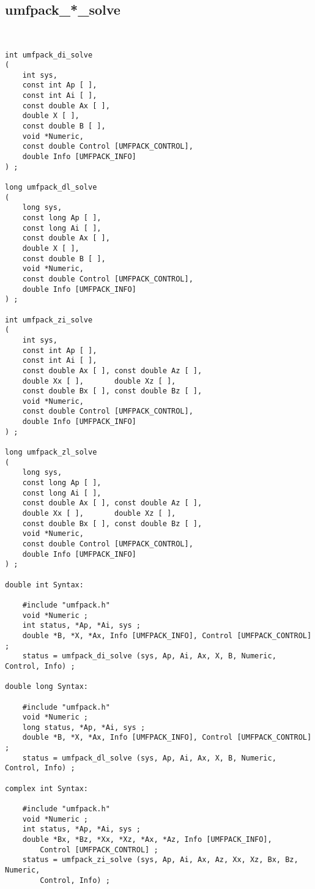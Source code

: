 \newpage
\subsection{umfpack\_*\_solve}

{\footnotesize
\begin{verbatim}


int umfpack_di_solve
(
    int sys,
    const int Ap [ ],
    const int Ai [ ],
    const double Ax [ ],
    double X [ ],
    const double B [ ],
    void *Numeric,
    const double Control [UMFPACK_CONTROL],
    double Info [UMFPACK_INFO]
) ;

long umfpack_dl_solve
(
    long sys,
    const long Ap [ ],
    const long Ai [ ],
    const double Ax [ ],
    double X [ ],
    const double B [ ],
    void *Numeric,
    const double Control [UMFPACK_CONTROL],
    double Info [UMFPACK_INFO]
) ;

int umfpack_zi_solve
(
    int sys,
    const int Ap [ ],
    const int Ai [ ],
    const double Ax [ ], const double Az [ ],
    double Xx [ ],       double Xz [ ],
    const double Bx [ ], const double Bz [ ],
    void *Numeric,
    const double Control [UMFPACK_CONTROL],
    double Info [UMFPACK_INFO]
) ;

long umfpack_zl_solve
(
    long sys,
    const long Ap [ ],
    const long Ai [ ],
    const double Ax [ ], const double Az [ ],
    double Xx [ ],       double Xz [ ],
    const double Bx [ ], const double Bz [ ],
    void *Numeric,
    const double Control [UMFPACK_CONTROL],
    double Info [UMFPACK_INFO]
) ;

double int Syntax:

    #include "umfpack.h"
    void *Numeric ;
    int status, *Ap, *Ai, sys ;
    double *B, *X, *Ax, Info [UMFPACK_INFO], Control [UMFPACK_CONTROL] ;
    status = umfpack_di_solve (sys, Ap, Ai, Ax, X, B, Numeric, Control, Info) ;

double long Syntax:

    #include "umfpack.h"
    void *Numeric ;
    long status, *Ap, *Ai, sys ;
    double *B, *X, *Ax, Info [UMFPACK_INFO], Control [UMFPACK_CONTROL] ;
    status = umfpack_dl_solve (sys, Ap, Ai, Ax, X, B, Numeric, Control, Info) ;

complex int Syntax:

    #include "umfpack.h"
    void *Numeric ;
    int status, *Ap, *Ai, sys ;
    double *Bx, *Bz, *Xx, *Xz, *Ax, *Az, Info [UMFPACK_INFO],
        Control [UMFPACK_CONTROL] ;
    status = umfpack_zi_solve (sys, Ap, Ai, Ax, Az, Xx, Xz, Bx, Bz, Numeric,
        Control, Info) ;


\end{verbatim}}
